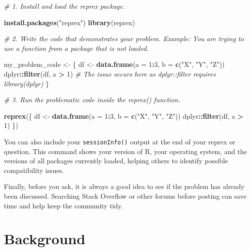 \documentclass[
]{book}
\newenvironment{Shaded}{\begin{snugshade}}{\end{snugshade}}
\newcommand{\AttributeTok}[1]{\textcolor[rgb]{0.13,0.29,0.53}{#1}}
\newcommand{\CommentTok}[1]{\textcolor[rgb]{0.56,0.35,0.01}{\textit{#1}}}
\newcommand{\DecValTok}[1]{\textcolor[rgb]{0.00,0.00,0.81}{#1}}
\newcommand{\FunctionTok}[1]{\textcolor[rgb]{0.13,0.29,0.53}{\textbf{#1}}}
\newcommand{\NormalTok}[1]{#1}
\newcommand{\OtherTok}[1]{\textcolor[rgb]{0.56,0.35,0.01}{#1}}
\newcommand{\SpecialCharTok}[1]{\textcolor[rgb]{0.81,0.36,0.00}{\textbf{#1}}}
\newcommand{\StringTok}[1]{\textcolor[rgb]{0.31,0.60,0.02}{#1}}
\begin{document}
\begin{Shaded}
\begin{Highlighting}[]
\CommentTok{\# 1. Install and load the reprex package.}

\FunctionTok{install.packages}\NormalTok{(}\StringTok{"reprex"}\NormalTok{) }
\FunctionTok{library}\NormalTok{(reprex)}

\CommentTok{\# 2. Write the code that demonstrates your problem. Example: You are trying to use a function from a package that is not loaded.}

\NormalTok{my\_problem\_code }\OtherTok{\textless{}{-}}\NormalTok{ \{}
\NormalTok{  df }\OtherTok{\textless{}{-}} \FunctionTok{data.frame}\NormalTok{(}\AttributeTok{a =} \DecValTok{1}\SpecialCharTok{:}\DecValTok{3}\NormalTok{, }\AttributeTok{b =} \FunctionTok{c}\NormalTok{(}\StringTok{"X"}\NormalTok{, }\StringTok{"Y"}\NormalTok{, }\StringTok{"Z"}\NormalTok{))}
\NormalTok{  dplyr}\SpecialCharTok{::}\FunctionTok{filter}\NormalTok{(df, a }\SpecialCharTok{\textgreater{}} \DecValTok{1}\NormalTok{)   }\CommentTok{\# The issue occurs here as dplyr::filter requires library(dplyr)}
\NormalTok{\}}

\CommentTok{\# 3. Run the problematic code inside the reprex() function.}

\FunctionTok{reprex}\NormalTok{(\{}
\NormalTok{  df }\OtherTok{\textless{}{-}} \FunctionTok{data.frame}\NormalTok{(}\AttributeTok{a =} \DecValTok{1}\SpecialCharTok{:}\DecValTok{3}\NormalTok{, }\AttributeTok{b =} \FunctionTok{c}\NormalTok{(}\StringTok{"X"}\NormalTok{, }\StringTok{"Y"}\NormalTok{, }\StringTok{"Z"}\NormalTok{))}
\NormalTok{  dplyr}\SpecialCharTok{::}\FunctionTok{filter}\NormalTok{(df, a }\SpecialCharTok{\textgreater{}} \DecValTok{1}\NormalTok{)}
\NormalTok{\})}
\end{Highlighting}
\end{Shaded}

You can also include your \texttt{sessionInfo()} output at the end of your reprex or question. This command shows your version of R, your operating system, and the versions of all packages currently loaded, helping others to identify possible compatibility issues.

Finally, before you ask, it is always a good idea to see if the problem has already been discussed. Searching Stack Overflow or other forums before posting can save time and help keep the community tidy.

\chapter{Background}\label{background}
\end{document}

